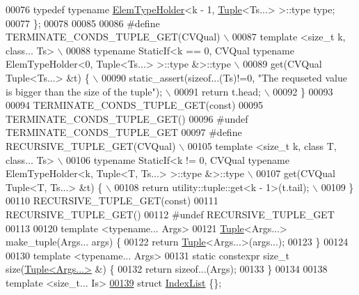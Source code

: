 \begin{DoxyCode}
00076   \textcolor{keyword}{typedef} \textcolor{keyword}{typename} \hyperlink{structutility_1_1tuple_1_1_elem_type_holder}{ElemTypeHolder}<k - 1, \hyperlink{structutility_1_1tuple_1_1_tuple}{Tuple}<Ts...> >::type type;
00077 \};
00078 
00085 
00086 \textcolor{preprocessor}{#define TERMINATE\_CONDS\_TUPLE\_GET(CVQual) \(\backslash\)}
00087 \textcolor{preprocessor}{template <size\_t k, class... Ts> \(\backslash\)}
00088 \textcolor{preprocessor}{typename StaticIf<k == 0, CVQual typename ElemTypeHolder<0, Tuple<Ts...> >::type &>::type \(\backslash\)}
00089 \textcolor{preprocessor}{get(CVQual Tuple<Ts...> &t) \{ \(\backslash\)}
00090 \textcolor{preprocessor}{  static\_assert(sizeof...(Ts)!=0, "The requseted value is bigger than the size of the tuple"); \(\backslash\)}
00091 \textcolor{preprocessor}{  return t.head; \(\backslash\)}
00092 \textcolor{preprocessor}{\}}
00093 
00094 TERMINATE\_CONDS\_TUPLE\_GET(\textcolor{keyword}{const})
00095 TERMINATE\_CONDS\_TUPLE\_GET()
00096 \textcolor{preprocessor}{#undef TERMINATE\_CONDS\_TUPLE\_GET}
00097 \textcolor{preprocessor}{#define RECURSIVE\_TUPLE\_GET(CVQual) \(\backslash\)}
00105 \textcolor{preprocessor}{template <size\_t k, class T, class... Ts> \(\backslash\)}
00106 \textcolor{preprocessor}{typename StaticIf<k != 0, CVQual typename ElemTypeHolder<k, Tuple<T, Ts...> >::type &>::type \(\backslash\)}
00107 \textcolor{preprocessor}{get(CVQual Tuple<T, Ts...> &t) \{ \(\backslash\)}
00108 \textcolor{preprocessor}{  return utility::tuple::get<k - 1>(t.tail); \(\backslash\)}
00109 \textcolor{preprocessor}{\}}
00110 RECURSIVE\_TUPLE\_GET(\textcolor{keyword}{const})
00111 RECURSIVE\_TUPLE\_GET()
00112 \textcolor{preprocessor}{#undef RECURSIVE\_TUPLE\_GET}
00113 
00120 \textcolor{keyword}{template} <\textcolor{keyword}{typename}... Args>
00121 \hyperlink{structutility_1_1tuple_1_1_tuple}{Tuple}<Args...> make\_tuple(Args... args) \{
00122   \textcolor{keywordflow}{return} \hyperlink{structutility_1_1tuple_1_1_tuple}{Tuple}<Args...>(args...);
00123 \}
00124 
00130 \textcolor{keyword}{template} <\textcolor{keyword}{typename}... Args>
00131 \textcolor{keyword}{static} constexpr \textcolor{keywordtype}{size\_t} size(\hyperlink{structutility_1_1tuple_1_1_tuple}{Tuple<Args...>} &) \{
00132   \textcolor{keywordflow}{return} \textcolor{keyword}{sizeof}...(Args);
00133 \}
00134 
00138 \textcolor{keyword}{template} <\textcolor{keywordtype}{size\_t}... Is>
\hyperlink{structutility_1_1tuple_1_1_index_list}{00139} \textcolor{keyword}{struct }\hyperlink{structutility_1_1tuple_1_1_index_list}{IndexList} \{\};

\end{DoxyCode}
